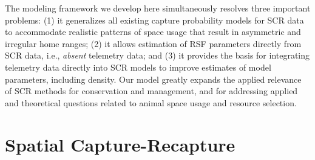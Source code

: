 \documentclass[12pt]{article}
\begin{document}

The modeling framework we develop here
simultaneously resolves three important %
problems: (1) it
generalizes all existing capture
 probability models for SCR data to
accommodate realistic patterns of space usage that result in
asymmetric and irregular home ranges; %
(2) it allows estimation of RSF
parameters directly from SCR data, i.e., {\it absent} telemetry data;
and (3) it provides the basis for integrating telemetry data directly into SCR
models to improve estimates of model parameters, including density.
Our model greatly expands the applied relevance of SCR methods for
conservation and management, and for addressing applied and
theoretical questions related to animal space usage and resource selection.



\section{Spatial Capture-Recapture}
\end{document}
